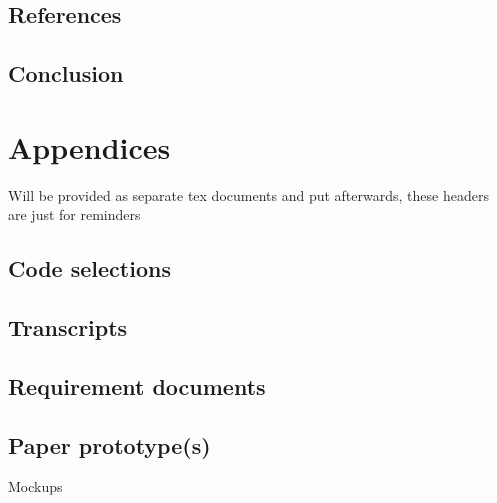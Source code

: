\documentclass[]{report}
\begin{document}
\section{References}

{}



\section{Conclusion}

\chapter{Appendices}

Will be provided as separate tex documents and put afterwards, these headers are
just for reminders

\section{Code selections}

\section{Transcripts}

\section{Requirement documents}

\section{Paper prototype(s)}

Mockups\cite{site:mockups}
\end{document}
